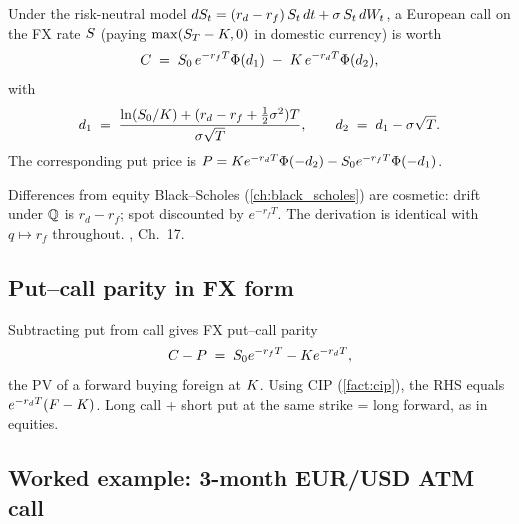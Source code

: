 \begin{keyfactbox}
\label{fact:garman_kohlhagen}
Under the risk-neutral model
$dS_t = (r_d - r_f)\,S_t\,dt + \sigma\,S_t\,dW_t$,
a European call on the FX rate $S$ (paying
$\max(S_T - K, 0)$ in domestic currency) is worth
\begin{equation}
  C \;=\; S_0 \, e^{-r_f T} \Phi(d_1)
              \;-\; K \, e^{-r_d T} \Phi(d_2),
  \label{eq:gk_call}
\end{equation}
with
\begin{equation}
  d_1 \;=\; \frac{\ln(S_0/K) + (r_d - r_f + \tfrac12 \sigma^2)T}
                 {\sigma \sqrt{T}},
  \qquad
  d_2 \;=\; d_1 - \sigma\sqrt{T}.
  \label{eq:gk_d1d2}
\end{equation}
The corresponding put price is
$P = K e^{-r_d T}\Phi(-d_2) - S_0 e^{-r_f T}\Phi(-d_1)$.
\end{keyfactbox}

Differences from equity Black--Scholes (\cref{ch:black_scholes}) are
cosmetic: drift under $\mathbb{Q}$ is $r_d - r_f$; spot discounted by
$e^{-r_f T}$.  The derivation is identical with
$q \mapsto r_f$ throughout.  \citeHull, Ch.\ 17.

\subsection{Put--call parity in FX form}

Subtracting put from call gives FX put--call parity
\begin{equation}
  C - P \;=\; S_0 e^{-r_f T} - K e^{-r_d T},
  \label{eq:fx_putcall}
\end{equation}
the PV of a forward buying foreign at $K$.  Using CIP
(\cref{fact:cip}), the RHS equals $e^{-r_d T}(F - K)$.  Long
call + short put at the same strike = long forward, as in equities.

\subsection{Worked example: 3-month EUR/USD ATM call}
\label{subsec:gk_example}

